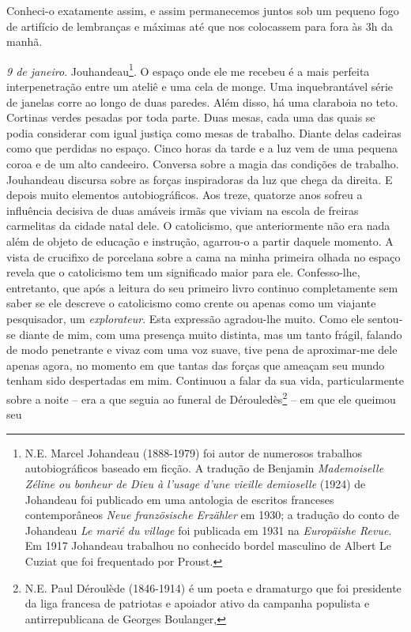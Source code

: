 Conheci-o exatamente assim, e assim permanecemos juntos sob um pequeno
fogo de artifício de lembranças e máximas até que nos colocassem para
fora às 3h da manhã.

\emph{9 de janeiro}. Jouhandeau\footnote{N.E. Marcel Johandeau
  (1888-1979) foi autor de numerosos trabalhos autobiográficos baseado
  em ficção. A tradução de Benjamin \emph{Mademoiselle Zéline ou bonheur
  de Dieu à l'usage d'une vieille demioselle} (1924) de Johandeau foi
  publicado em uma antologia de escritos franceses contemporâneos
  \emph{Neue französische Erzähler} em 1930; a tradução do conto de
  Johandeau \emph{Le marié du village} foi publicada em 1931 na
  \emph{Europäishe Revue}. Em 1917 Johandeau trabalhou no conhecido
  bordel masculino de Albert Le Cuziat que foi frequentado por Proust.}.
O espaço onde ele me recebeu é a mais perfeita interpenetração entre um
ateliê e uma cela de monge. Uma inquebrantável série de janelas corre ao
longo de duas paredes. Além disso, há uma claraboia no teto. Cortinas
verdes pesadas por toda parte. Duas mesas, cada uma das quais se podia
considerar com igual justiça como mesas de trabalho. Diante delas
cadeiras como que perdidas no espaço. Cinco horas da tarde e a luz vem
de uma pequena coroa e de um alto candeeiro. Conversa sobre a magia das
condições de trabalho. Jouhandeau discursa sobre as forças inspiradoras
da luz que chega da direita. E depois muito elementos autobiográficos.
Aos treze, quatorze anos sofreu a influência decisiva de duas amáveis
irmãs que viviam na escola de freiras carmelitas da cidade natal dele. O
catolicismo, que anteriormente não era nada além de objeto de educação e
instrução, agarrou-o a partir daquele momento. A vista de crucifixo de
porcelana sobre a cama na minha primeira olhada no espaço revela que o
catolicismo tem um significado maior para ele. Confesso-lhe, entretanto,
que após a leitura do seu primeiro livro continuo completamente sem
saber se ele descreve o catolicismo como crente ou apenas como um
viajante pesquisador, um \emph{explorateur}. Esta expressão agradou-lhe
muito. Como ele sentou-se diante de mim, com uma presença muito
distinta, mas um tanto frágil, falando de modo penetrante e vivaz com
uma voz suave, tive pena de aproximar-me dele apenas agora, no momento
em que tantas das forças que ameaçam seu mundo tenham sido despertadas
em mim. Continuou a falar da sua vida, particularmente sobre a noite --
era a que seguia ao funeral de Dérouledès\footnote{N.E. Paul Déroulède
  (1846-1914) é um poeta e dramaturgo que foi presidente da liga
  francesa de patriotas e apoiador ativo da campanha populista e
  antirrepublicana de Georges Boulanger,} -- em que ele queimou seu

